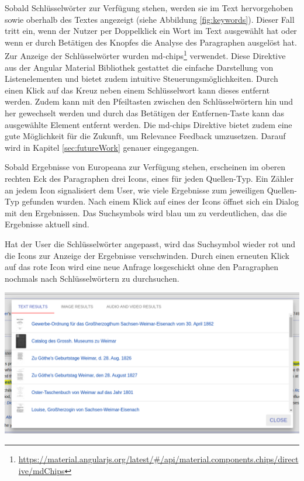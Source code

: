 Sobald Schlüsselwörter zur Verfügung stehen, werden sie im Text hervorgehoben sowie oberhalb des Textes angezeigt (siehe Abbildung \ref{fig:keywords}). Dieser Fall tritt ein, wenn der Nutzer per Doppelklick ein Wort im Text ausgewählt hat oder wenn er durch Betätigen des Knopfes die Analyse des Paragraphen ausgelöst hat. Zur Anzeige der Schlüsselwörter wurden md-chips\footnote{\url{https://material.angularjs.org/latest/\#/api/material.components.chips/directive/mdChips}} verwendet. Diese Direktive aus der Angular Material Bibliothek gestattet die einfache Darstellung von Listenelementen und bietet zudem intuitive Steuerungsmöglichkeiten. Durch einen Klick auf das Kreuz neben einem Schlüsselwort kann dieses entfernt werden. Zudem kann mit den Pfeiltasten zwischen den Schlüsselwörtern hin und her gewechselt werden und durch das Betätigen der Entfernen-Taste kann das ausgewählte Element entfernt werden. Die md-chips Direktive bietet zudem eine gute Möglichkeit für die Zukunft, um Relevance Feedback umzusetzen. Darauf wird in Kapitel \ref{sec:futureWork} genauer eingegangen.

 Sobald Ergebnisse von Europeana zur Verfügung stehen, erscheinen im oberen rechten Eck des Paragraphen drei Icons, eines für jeden Quellen-Typ. Ein Zähler an jedem Icon signalisiert dem User, wie viele Ergebnisse zum jeweiligen Quellen-Typ gefunden wurden. Nach einem Klick auf eines der Icons öffnet sich ein Dialog mit den Ergebnissen. Das Suchsymbols wird blau um zu verdeutlichen, das die Ergebnisse aktuell sind.

 Hat der User die Schlüsselwörter angepasst, wird das Suchsymbol wieder rot und die Icons zur Anzeige der Ergebnisse verschwinden. Durch einen erneuten Klick auf das rote Icon wird eine neue Anfrage losgeschickt ohne den Paragraphen nochmals nach Schlüsselwörtern zu durchsuchen.

 \begin{minipage}{\linewidth}
	\centering
	\vspace*{0.5cm}
	\includegraphics[width=\linewidth]{Bilder/app-screenshots/text-results.png}
	\label{fig:textResults}
	\vspace*{0.5cm}
 \end{minipage}

